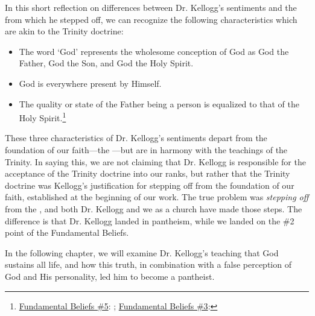 In this short reflection on differences between Dr. Kellogg's sentiments and the  from which he stepped off, we can recognize the following characteristics which are akin to the Trinity doctrine:

\begin{itemize}
    \item The word ‘God’ represents the wholesome conception of God as God the Father, God the Son, and God the Holy Spirit.
    \item God is everywhere present by Himself.
    \item The quality or state of the Father being a person is equalized to that of the Holy Spirit.\footnote{\href{https://www.adventist.org/wp-content/uploads/2020/06/ADV-28Beliefs2020.pdf}{Fundamental Beliefs \#5}: ; \href{https://www.adventist.org/wp-content/uploads/2020/06/ADV-28Beliefs2020.pdf}{Fundamental Beliefs \#3}: }
\end{itemize}

These three characteristics of Dr. Kellogg's sentiments depart from the foundation of our faith—the —but are in harmony with the teachings of the Trinity. In saying this, we are not claiming that Dr. Kellogg is responsible for the acceptance of the Trinity doctrine into our ranks, but rather that the Trinity doctrine was Kellogg's justification for stepping off from the foundation of our faith, established at the beginning of our work. The true problem was \textit{stepping off} from the , and both Dr. Kellogg and we as a church have made those steps. The difference is that Dr. Kellogg landed in pantheism, while we landed on the \#2 point of the Fundamental Beliefs.

In the following chapter, we will examine Dr. Kellogg's teaching that God sustains all life, and how this truth, in combination with a false perception of God and His personality, led him to become a pantheist.

